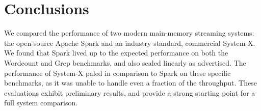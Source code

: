 \section{Conclusions}
We compared the performance of two modern main-memory streaming systems: the open-source Apache Spark and an industry standard, commercial System-X.  We found that Spark lived up to the expected performance on both the Wordcount and Grep benchmarks, and also scaled linearly as advertised.  The performance of System-X paled in comparison to Spark on these specific benchmarks, as it was unable to handle even a fraction of the throughput.  These evaluations exhibit preliminary results, and provide a strong starting point for a full system comparison.